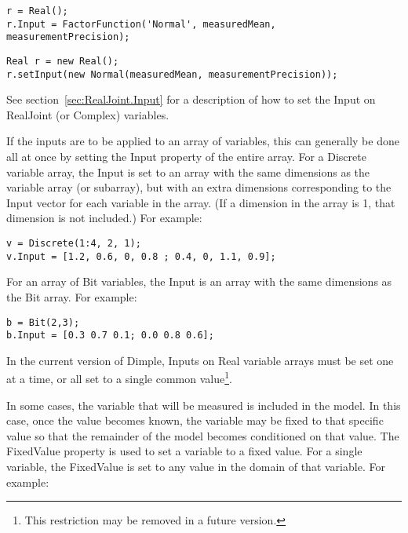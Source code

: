 \ifmatlab

\begin{lstlisting}
r = Real();
r.Input = FactorFunction('Normal', measuredMean, measurementPrecision);
\end{lstlisting}

\fi

\ifjava

\begin{lstlisting}
Real r = new Real();
r.setInput(new Normal(measuredMean, measurementPrecision));
\end{lstlisting}

\fi

See section~\ref{sec:RealJoint.Input} for a description of how to set the Input on RealJoint (or Complex) variables.

\ifmatlab

If the inputs are to be applied to an array of variables, this can generally be done all at once by setting the Input property of the entire array.  For a Discrete variable array, the Input is set to an array with the same dimensions as the variable array (or subarray), but with an extra dimensions corresponding to the Input vector for each variable in the array.  (If a dimension in the array is 1, that dimension is not included.) For example:

\begin{lstlisting}
v = Discrete(1:4, 2, 1);
v.Input = [1.2, 0.6, 0, 0.8 ; 0.4, 0, 1.1, 0.9];
\end{lstlisting}

For an array of Bit variables, the Input is an array with the same dimensions as the Bit array.  For example:

\begin{lstlisting}
b = Bit(2,3);
b.Input = [0.3 0.7 0.1; 0.0 0.8 0.6];
\end{lstlisting}

In the current version of Dimple, Inputs on Real variable arrays must be set one at a time, or all set to a single common value\footnote{This restriction may be removed in a future version.}.

\fi

\label{sec:FixingAVariableValue}

In some cases, the variable that will be measured is included in the model.  In this case, once the value becomes known, the variable may be fixed to that specific value so that the remainder of the model becomes conditioned on that value.  The FixedValue property is used to set a variable to a fixed value.  For a single variable, the FixedValue is set to any value in the domain of that variable.  For example:

